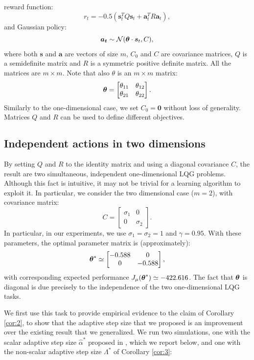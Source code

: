 reward function:
\[
	r_t=-0.5(\boldsymbol{s}_t^TQ\boldsymbol{s}_t + \boldsymbol{a}_t^TR\boldsymbol{a}_t),
\]
and Gaussian policy:
\[
	\boldsymbol{a_t} \sim \mathcal{N}(\boldsymbol{\theta} \cdot \boldsymbol{s}_t,C),
\]
where both $\boldsymbol{s}$ and $\boldsymbol{a}$ are vectors of size $m$, $C_0$ and $C$ are covariance matrices, $Q$ is a semidefinite matrix and $R$ is a symmetric positive definite matrix. All the matrices are $m\times m$. Note that also $\theta$ is an $m \times m$ matrix:
\[
\boldsymbol{\theta} = \begin{bmatrix}
\theta_{11} & \theta_{12} \\
\theta_{21} & \theta_{22}
\end{bmatrix}.
\]
Similarly to the one-dimensional case, we set $C_0=\boldsymbol{0}$ without loss of generality. Matrices $Q$ and $R$ can be used to define different objectives.

\subsection{Independent actions in two dimensions}
By setting $Q$ and $R$ to the identity matrix and using a diagonal covariance $C$, the result are two simultaneous, independent one-dimensional \ac{LQG} problems. Although this fact is intuitive, it may not be trivial for a learning algorithm to exploit it. In particular, we consider the two dimensional case ($m=2$), with covariance matrix:
\[
	C = 
	\begin{bmatrix}
	\sigma_1 & 0 		\\
	0		 & \sigma_2
	\end{bmatrix}.
\]
In particular, in our experiments, we use $\sigma_1 = \sigma_2 = 1$ and $\gamma = 0.95$. With these parameters, the optimal parameter matrix is (approximately):
\[
	\boldsymbol{\theta}^* \simeq 
	\begin{bmatrix}
	-0.588 & 0 		\\
	0		 & -0.588
	\end{bmatrix},
\]
with corresponding expected performance $J_\mu(\boldsymbol{\theta}^*) \simeq -422.616$. The fact that $\boldsymbol{\theta}$ is diagonal is due precisely to the independence of the two one-dimensional \ac{LQG} tasks.

We first use this task to provide empirical evidence to the claim of Corollary \ref{cor:2}, \ie to show that the adaptive step size that we proposed is an improvement over the existing result that we generalized. We run two simulations, one with the scalar adaptive step size $\hat{\alpha}^*$ proposed in \cite{NIPS2013_5186}, which we report below, and one with the non-scalar adaptive step size $\Lambda^*$ of Corollary \ref{cor:3}:

